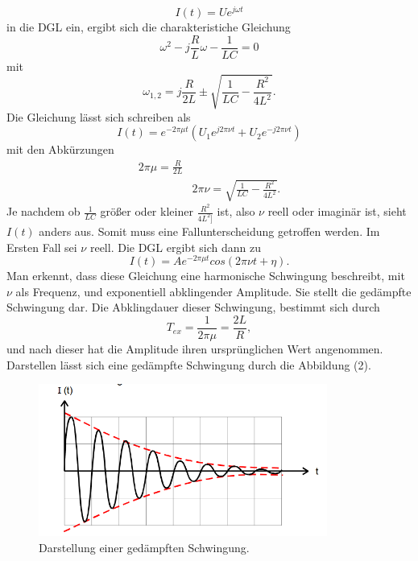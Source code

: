 \begin{equation*}
I(t) = U e^{j\omega t}
\end{equation*}
in die DGL ein, ergibt sich die charakteristiche Gleichung
\begin{equation}
\omega^{2} - j\frac{R}{L}\omega - \frac{1}{LC} = 0 
\end{equation}
\noindent mit 
\begin{equation}
\omega_{1,2} = j \frac{R}{2L} \pm \sqrt{\frac{1}{LC} - \frac{R^{2}}{4L^{2}}} .
\end{equation}
\noindent Die Gleichung lässt sich schreiben als 
\begin{equation}
I(t) = e^{-2\pi \mu t}(U_1 e^{j2\pi \nu t} + U_2 e^{-j2\pi \nu t})
\end{equation}
\noindent mit den Abkürzungen 
\begin{align}
2\pi \mu = \frac{R}{2L} \\
&2\pi \nu = \sqrt{\frac{1}{LC} - \frac{R^{2}}{4L^{2}}} .
\end{align}
\noindent Je nachdem ob $\frac{1}{LC}$ größer oder kleiner $\frac{R^2}{4L^2]}$ ist, also $\nu$ reell oder imaginär ist,
sieht $I(t)$ anders aus. Somit muss eine Fallunterscheidung getroffen werden.
Im Ersten Fall sei $\nu$ reell. Die DGL ergibt sich dann zu
\begin{equation}
I(t) = Ae^{-2\pi \mu t}cos(2\pi \nu t + \eta) .
\end{equation}
Man erkennt, dass diese Gleichung eine harmonische Schwingung beschreibt, mit $\nu$ als Frequenz, und exponentiell abklingender Amplitude.
Sie stellt die gedämpfte Schwingung dar. Die Abklingdauer dieser Schwingung, bestimmt sich durch
\begin{equation}
T_{ex} = \frac{1}{2\pi \mu} = \frac{2L}{R} ,
\end{equation}
und nach dieser hat die Amplitude ihren ursprünglichen Wert angenommen.
Darstellen lässt sich eine gedämpfte Schwingung durch die Abbildung (2).
\begin{figure}[H]
  \centering
  \includegraphics[height=5cm]{grenzfall.png}
  \caption{Darstellung einer gedämpften Schwingung. \cite[S.4]{kent}}
\end{figure}
